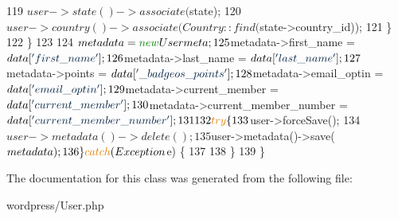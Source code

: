 \begin{DoxyCode}
119                 $user->state()->associate($state);
120                 $user->country()->associate(Country::find($state->country\_id));
121             \}
122         \}
123 
124         $metadata                           = \textcolor{keyword}{new} Usermeta;
125         $metadata->first\_name               = $data[\textcolor{stringliteral}{'first\_name'}];
126         $metadata->last\_name                = $data[\textcolor{stringliteral}{'last\_name'}];
127         $metadata->points                   = $data[\textcolor{stringliteral}{'\_badgeos\_points'}];
128         $metadata->email\_optin              = $data[\textcolor{stringliteral}{'email\_optin'}];
129         $metadata->current\_member           = $data[\textcolor{stringliteral}{'current\_member'}];
130         $metadata->current\_member\_number    = $data[\textcolor{stringliteral}{'current\_member\_number'}];
131 
132         \textcolor{keywordflow}{try} \{
133             $user->forceSave();
134             $user->metadata()->delete();
135             $user->metadata()->save($metadata);
136         \} \textcolor{keywordflow}{catch}(Exception $e) \{
137 
138         \}
139     \}
\end{DoxyCode}


The documentation for this class was generated from the following file\-:\begin{DoxyCompactItemize}
\item 
wordpress/User.\-php\end{DoxyCompactItemize}
